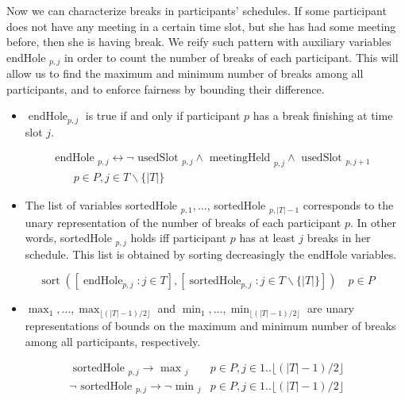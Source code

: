 \documentclass[10pt]{article}
\begin{document}
Now we can characterize breaks in participants' schedules. If some participant does not have any meeting in a certain time slot, but she has had some meeting before, then she is having break. We reify such pattern with auxiliary variables endHole $_{p, j}$ in order to count the number of breaks of each participant. This will allow us to find the maximum and minimum number of breaks among all participants, and to enforce fairness by bounding their difference.

\begin{itemize}
  \item $\operatorname{endHole}_{p, j}$ is true if and only if participant $p$ has a break finishing at time slot $j$.
\end{itemize}


\begin{align*}
& \text { endHole }_{p, j} \leftrightarrow \neg \text { usedSlot }_{p, j} \wedge \text { meetingHeld }_{p, j} \wedge \text { usedSlot }_{p, j+1} \\
& \qquad p \in P, j \in T \backslash\{|T|\} \tag{35}
\end{align*}


\begin{itemize}
  \item The list of variables sortedHole $_{p, 1}, \ldots$, sortedHole $_{p,|T|-1}$ corresponds to the unary representation of the number of breaks of each participant $p$. In other words, sortedHole $_{p, j}$ holds iff participant $p$ has at least $j$ breaks in her schedule. This list is obtained by sorting decreasingly the endHole variables.
\end{itemize}


\begin{equation*}
\operatorname{sort}\left(\left[\operatorname{endHole}_{p, j}: j \in T\right],\left[\operatorname{sortedHole}_{p, j}: j \in T \backslash\{|T|\}\right]\right) \quad p \in P \tag{36}
\end{equation*}


\begin{itemize}
  \item $\max _{1}, \ldots, \max _{\lfloor(|T|-1) / 2\rfloor}$ and $\min _{1}, \ldots, \min _{\lfloor(|T|-1) / 2\rfloor}$ are unary representations of bounds on the maximum and minimum number of breaks among all participants, respectively.
\end{itemize}

\[
\begin{array}{cl}
\text { sortedHole }_{p, j} \rightarrow \text { max }_{j} & p \in P, j \in 1 . .\lfloor(|T|-1) / 2\rfloor \\
\neg \text { sortedHole }_{p, j} \rightarrow \neg \text { min }_{j} & p \in P, j \in 1 . .\lfloor(|T|-1) / 2\rfloor \tag{38}
\end{array}
\]
\end{document}
